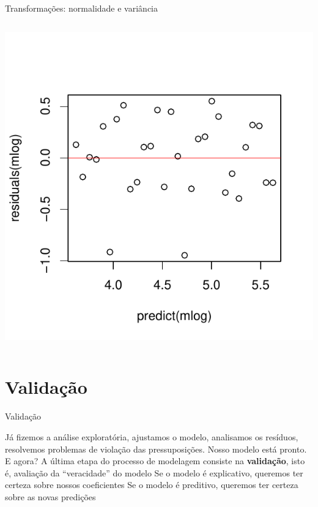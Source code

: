 \documentclass{beamer}\usepackage[]{graphicx}\usepackage[]{color}
\newenvironment{knitrout}{}{} %
\renewenvironment{knitrout}{\setlength{\topsep}{0mm}}{}
\begin{document}
\begin{frame}{Transformações: normalidade e variância}
\begin{columns}[c]
\begin{knitrout}\scriptsize
{}\color{fgcolor}
\includegraphics[width=0.9\linewidth]{figure/t4-1} 

\end{knitrout}

\end{columns}

\end{frame}

\section{Validação}


\begin{frame}{Validação}

Já fizemos a análise exploratória, ajustamos o modelo, analisamos os resíduos, resolvemos problemas de violação das pressuposições. Nosso modelo está pronto. \pause
\vfill
E agora?\pause
\vfill
A última etapa do processo de modelagem consiste na \textbf{validação}, isto é, avaliação da ``veracidade'' do modelo \pause
\vfill
Se o modelo é explicativo, queremos ter certeza sobre nossos coeficientes \pause
\vfill
Se o modelo é preditivo, queremos ter certeza sobre as novas predições 

\end{frame}
\end{document}
